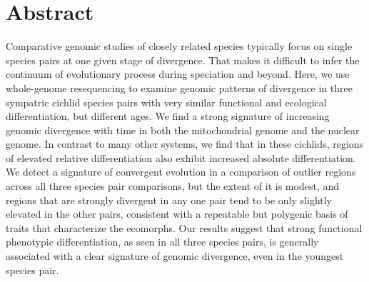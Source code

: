\section{Abstract}

Comparative genomic studies of closely related species typically focus on single species pairs at one given stage of divergence. That makes it difficult to infer the continuum of evolutionary process during speciation and beyond. Here, we use whole-genome resequencing to examine genomic patterns of divergence in three sympatric cichlid species pairs with very similar functional and ecological differentiation, but different ages. We find a strong signature of increasing genomic divergence with time in both the mitochondrial genome and the nuclear genome. In contrast to many other systems, we find that in these cichlids, regions of elevated relative differentiation also exhibit increased absolute differentiation. We detect a signature of convergent evolution in a comparison of outlier regions across all three species pair comparisons, but the extent of it is modest, and regions that are strongly divergent in any one pair tend to be only slightly elevated in the other pairs, consistent with a repeatable but polygenic basis of traits that characterize the ecomorphs. Our results suggest that strong functional phenotypic differentiation, as seen in all three species pairs, is generally associated with a clear signature of genomic divergence, even in the youngest species pair.